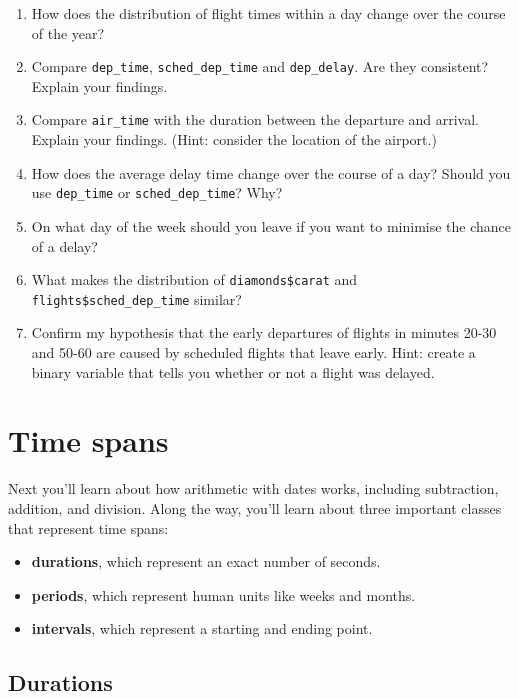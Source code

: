 \documentclass[]{book}
\providecommand{\tightlist}{%
  \setlength{\itemsep}{0pt}\setlength{\parskip}{0pt}}
\begin{document}
\begin{enumerate}
\def\labelenumi{\arabic{enumi}.}
\item
  How does the distribution of flight times within a day change over the
  course of the year?
\item
  Compare \texttt{dep\_time}, \texttt{sched\_dep\_time} and
  \texttt{dep\_delay}. Are they consistent? Explain your findings.
\item
  Compare \texttt{air\_time} with the duration between the departure and
  arrival. Explain your findings. (Hint: consider the location of the
  airport.)
\item
  How does the average delay time change over the course of a day?
  Should you use \texttt{dep\_time} or \texttt{sched\_dep\_time}? Why?
\item
  On what day of the week should you leave if you want to minimise the
  chance of a delay?
\item
  What makes the distribution of \texttt{diamonds\$carat} and
  \texttt{flights\$sched\_dep\_time} similar?
\item
  Confirm my hypothesis that the early departures of flights in minutes
  20-30 and 50-60 are caused by scheduled flights that leave early.
  Hint: create a binary variable that tells you whether or not a flight
  was delayed.
\end{enumerate}

\section{Time spans}\label{time-spans}

Next you'll learn about how arithmetic with dates works, including
subtraction, addition, and division. Along the way, you'll learn about
three important classes that represent time spans:

\begin{itemize}
\tightlist
\item
  \textbf{durations}, which represent an exact number of seconds.
\item
  \textbf{periods}, which represent human units like weeks and months.
\item
  \textbf{intervals}, which represent a starting and ending point.
\end{itemize}

\subsection{Durations}\label{durations}
\end{document}
